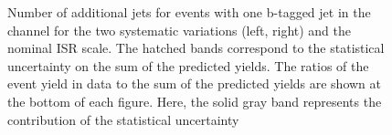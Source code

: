 \begin{figure}[htbp!]
\begin{center}
\caption{Number of additional jets for events with one b-tagged jet in the \emu channel for the two systematic variations (left, right) and the nominal ISR scale.
The hatched bands correspond to the statistical uncertainty on the sum of the predicted yields. 
        The ratios of the event yield in data to the sum of the predicted yields are
        shown at the bottom of each figure. Here, the solid gray band
        represents the contribution of the statistical uncertainty
  \label{fig:control_var_TT_ISRSCALE}}
  \end{center}
\end{figure}

\begin{figure}[htbp!]
  \begin{center}
    \\

\end{center}
\end{figure}

